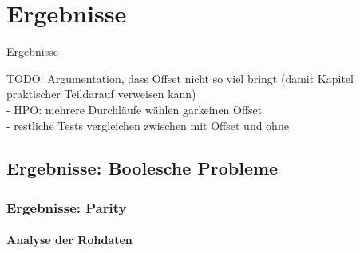 \chapter{Ergebnisse}
\label{Ergebnisse}
Ergebnisse

TODO: Argumentation, dass Offset nicht so viel bringt (damit Kapitel \glqq praktischer Teil\grqq\space darauf verweisen kann)\\
- HPO: mehrere Durchläufe wählen garkeinen Offset\\
- restliche Tests vergleichen zwischen mit Offset und ohne

\section{Ergebnisse: Boolesche Probleme}
\label{sec:ergebnisseBP}

\subsection{Ergebnisse: Parity}
\label{subsec:ergebnisseParity}
\subsubsection{Analyse der Rohdaten}
\label{parity:analyseRohdaten}

